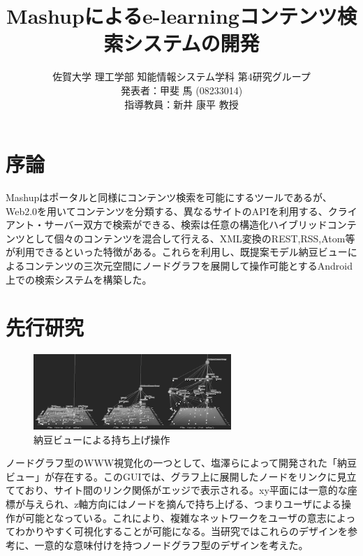 \documentclass[twocolumn,a4j]{jarticle}
\title{Mashupによるe-learningコンテンツ検索システムの開発}
\author{佐賀大学 理工学部 知能情報システム学科 第4研究グループ\\ 発表者：甲斐 \UTF{F9C3}馬 (08233014)\\ 指導教員：新井 康平 教授}
\begin{document}
\date{\empty}
\maketitle
\thispagestyle{empty}

\section{序論}
Mashupはポータルと同様にコンテンツ検索を可能にするツールであるが、Web2.0を用いてコンテンツを分類する、異なるサイトのAPIを利用する、クライアント・サーバー双方で検索ができる、検索は任意の構造化ハイブリッドコンテンツとして個々のコンテンツを混合して行える、XML変換のREST,RSS,Atom等が利用できるといった特徴がある。これらを利用し、既提案モデル納豆ビューによるコンテンツの三次元空間にノードグラフを展開して操作可能とするAndroid上での検索システムを構築した。

\section{先行研究}
\begin{figure}[htbp]
\begin{center}
\includegraphics[width=7.5cm]{eps/natto-kuro.eps}
\caption{納豆ビューによる持ち上げ操作}
\label{natto}
\end{center}
\end{figure}
ノードグラフ型のWWW視覚化の一つとして、塩澤らによって開発された「納豆ビュー」\cite{natto}が存在する。このGUIでは、グラフ上に展開したノードをリンクに見立てており、サイト間のリンク関係がエッジで表示される。xy平面には一意的な座標が与えられ、z軸方向にはノードを摘んで持ち上げる、つまりユーザによる操作が可能となっている。これにより、複雑なネットワークをユーザの意志によってわかりやすく可視化することが可能になる。当研究ではこれらのデザインを参考に、一意的な意味付けを持つノードグラフ型のデザインを考えた。
\end{document}
